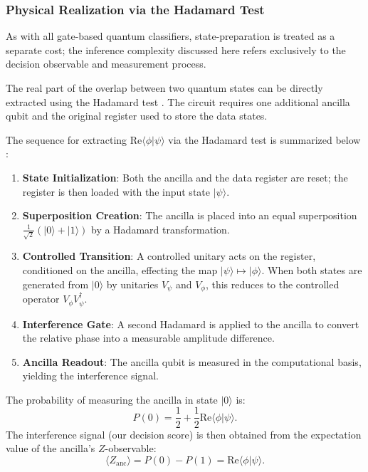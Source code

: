 \documentclass[conference]{IEEEtran}
\begin{document}
\subsubsection{Physical Realization via the Hadamard Test}
As with all gate-based quantum classifiers, state-preparation is treated as a separate cost; the inference complexity discussed here refers exclusively to the decision observable and measurement process.

The real part of the overlap between two quantum states can be directly extracted using the Hadamard test \cite{ekert2002direct}. The circuit requires one additional ancilla qubit and the original register used to store the data states.

The sequence for extracting $\mathrm{Re}\langle \phi | \psi \rangle$ via the Hadamard test is summarized below \cite{ekert2002direct}:
\begin{enumerate}
    \item \textbf{State Initialization}: Both the ancilla and the data register are reset; the register is then loaded with the input state $|\psi\rangle$.
    \item \textbf{Superposition Creation}: The ancilla is placed into an equal superposition $\frac{1}{\sqrt{2}}(|0\rangle + |1\rangle)$ by a Hadamard transformation.
    \item \textbf{Controlled Transition}: A controlled unitary acts on the register, conditioned on the ancilla, effecting the map $|\psi\rangle \mapsto |\phi\rangle$. When both states are generated from $|0\rangle$ by unitaries $V_\psi$ and $V_\phi$, this reduces to the controlled operator $V_\phi V_\psi^\dagger$.
    \item \textbf{Interference Gate}: A second Hadamard is applied to the ancilla to convert the relative phase into a measurable amplitude difference.
    \item \textbf{Ancilla Readout}: The ancilla qubit is measured in the computational basis, yielding the interference signal.
\end{enumerate}

The probability of measuring the ancilla in state $|0\rangle$ is:
\begin{equation}
P(0) = \frac{1}{2} + \frac{1}{2} \mathrm{Re}\langle \phi | \psi \rangle.
\end{equation}
The interference signal (our decision score) is then obtained from the expectation value of the ancilla's $Z$-observable:
\begin{equation}
\langle Z_{\text{anc}} \rangle = P(0) - P(1) = \mathrm{Re}\langle \phi | \psi \rangle.
\end{equation}
\end{document}
